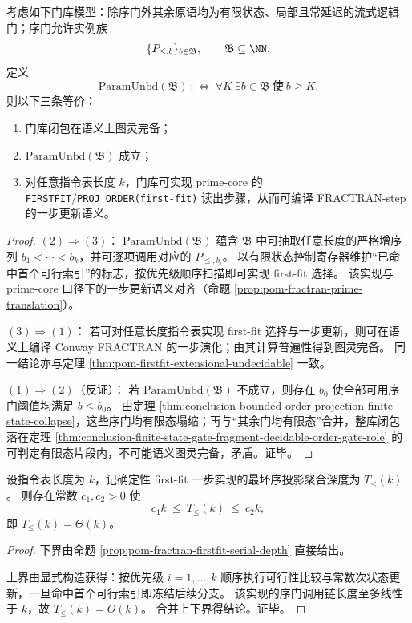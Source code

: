\begin{theorem}[序投影参数无界性与图灵完备分界]\label{thm:conclusion-order-parameter-unboundedness-turing-completeness}
考虑如下门库模型：除序门外其余原语均为有限状态、局部且常延迟的流式逻辑门；序门允许实例族
\[
\{P_{\le,b}\}_{b\in\mathfrak B},\qquad \mathfrak B\subseteq\NN.
\]
定义
\[
\mathrm{ParamUnbd}(\mathfrak B)
\ :\Longleftrightarrow\
\forall K\ \exists b\in\mathfrak B\ \text{使}\ b\ge K.
\]
则以下三条等价：
\begin{enumerate}
  \item 门库闭包在语义上图灵完备；
  \item \(\mathrm{ParamUnbd}(\mathfrak B)\) 成立；
  \item 对任意指令表长度 \(k\)，门库可实现 prime-core 的 \texttt{FIRSTFIT}/\texttt{PROJ\_ORDER(first-fit)} 读出步骤，从而可编译 FRACTRAN-step 的一步更新语义。
\end{enumerate}
\end{theorem}
\begin{proof}
\((2)\Rightarrow(3)\)：
\(\mathrm{ParamUnbd}(\mathfrak B)\) 蕴含 \(\mathfrak B\) 中可抽取任意长度的严格增序列 \(b_1<\cdots<b_k\)，并可逐项调用对应的 \(P_{\le,b_i}\)。
以有限状态控制寄存器维护“已命中首个可行索引”的标志，按优先级顺序扫描即可实现 first-fit 选择。
该实现与 prime-core 口径下的一步更新语义对齐（命题 \ref{prop:pom-fractran-prime-translation}）。

\((3)\Rightarrow(1)\)：
若可对任意长度指令表实现 first-fit 选择与一步更新，则可在语义上编译 Conway FRACTRAN 的一步演化；由其计算普遍性得到图灵完备。
同一结论亦与定理 \ref{thm:pom-firstfit-extensional-undecidable} 一致。

\((1)\Rightarrow(2)\)（反证）：
若 \(\mathrm{ParamUnbd}(\mathfrak B)\) 不成立，则存在 \(b_0\) 使全部可用序门阈值均满足 \(b\le b_0\)。
由定理 \ref{thm:conclusion-bounded-order-projection-finite-state-collapse}，这些序门均有限态塌缩；再与“其余门均有限态”合并，整库闭包落在定理 \ref{thm:conclusion-finite-state-gate-fragment-decidable-order-gate-role} 的可判定有限态片段内，不可能语义图灵完备，矛盾。证毕。
\end{proof}

\begin{proposition}[确定性 first-fit 序投影聚合深度的线性精确阶]\label{prop:conclusion-firstfit-serial-depth-theta-k}
设指令表长度为 \(k\)，记确定性 first-fit 一步实现的最坏序投影聚合深度为 \(T_{\le}(k)\)。
则存在常数 \(c_1,c_2>0\) 使
\[
c_1k\ \le\ T_{\le}(k)\ \le\ c_2k,
\]
即 \(T_{\le}(k)=\Theta(k)\)。
\end{proposition}
\begin{proof}
下界由命题 \ref{prop:pom-fractran-firstfit-serial-depth} 直接给出。

上界由显式构造获得：按优先级 \(i=1,\dots,k\) 顺序执行可行性比较与常数次状态更新，一旦命中首个可行索引即冻结后续分支。
该实现的序门调用链长度至多线性于 \(k\)，故 \(T_{\le}(k)=O(k)\)。
合并上下界得结论。证毕。
\end{proof}

